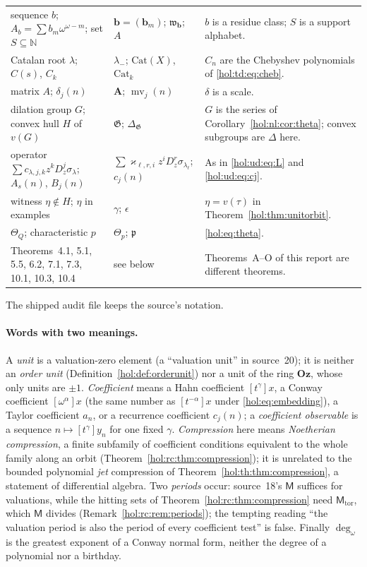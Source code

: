 \documentclass[11pt]{article}
\numberwithin{equation}{section}
\theoremstyle{definition}
\theoremstyle{remark}
\newcommand{\N}{\mathbb N}
\newcommand{\Oz}{\mathbf{Oz}}
\begin{document}
{\begin{longtable}{@{}>{\raggedright\arraybackslash}p{}
>{\raggedright\arraybackslash}p{}
>{\raggedright\arraybackslash}p{}@{}}
sequence $b$; $A_b=\sum b_m\omega^{\omega-m}$; set $S\subseteq\N$ &
$\mathbf b=(\mathbf b_m)$; $\mathfrak w_{\mathbf b}$; $A$ & $b$ is a residue
class; $S$ is a support alphabet.\\
Catalan root $\lambda$; $C(s)$, $C_k$ & $\lambda_-$; $\mathrm{Cat}(X)$,
$\mathrm{Cat}_k$ & $C_n$ are the Chebyshev polynomials of
\eqref{hol:td:eq:cheb}.\\
matrix $A$; $\delta_j(n)$ & $\mathbf A$; $\operatorname{mv}_j(n)$ & $\delta$
is a scale.\\
dilation group $G$; convex hull $H$ of $v(G)$ & $\mathfrak G$;
$\Delta_{\mathfrak G}$ & $G$ is the series of
Corollary~\ref{hol:nl:cor:theta}; convex subgroups are $\Delta$ here.\\
operator $\sum c_{\lambda,j,k}z^kD_z^j\sigma_\lambda$; $A_s(n)$, $B_j(n)$ &
$\sum\varkappa_{\ell,r,i}z^iD_z^r\sigma_{\lambda_\ell}$; $c_j(n)$ & As in
\eqref{hol:ud:eq:L} and \eqref{hol:ud:eq:cj}.\\
witness $\eta\notin H$; $\eta$ in examples & $\gamma$; $\epsilon$ &
$\eta=v(\tau)$ in Theorem~\ref{hol:thm:unitorbit}.\\
$\Theta_Q$; characteristic $p$ & $\Theta_p$; $\mathfrak p$ &
\eqref{hol:eq:theta}.\\
Theorems~4.1, 5.1, 5.5, 6.2, 7.1, 7.3, 10.1, 10.3, 10.4 & see below &
Theorems~A--O of this report are different theorems.\\
\bottomrule
\end{longtable}}
The shipped audit file  keeps the
source's notation.

\paragraph{Words with two meanings.}
A \emph{unit} is a valuation-zero element (a ``valuation unit'' in source~20);
it is neither an \emph{order unit} (Definition~\ref{hol:def:orderunit}) nor a
unit of the ring $\Oz$, whose only units are $\pm1$. \emph{Coefficient} means a
Hahn coefficient $[t^\gamma]x$, a Conway coefficient $[\omega^\alpha]x$ (the
same number as $[t^{-\alpha}]x$ under \eqref{hol:eq:embedding}), a Taylor
coefficient $a_n$, or a recurrence coefficient $c_j(n)$; a
\emph{coefficient observable} is a sequence $n\mapsto[t^\gamma]y_n$ for one
fixed $\gamma$. \emph{Compression} here means \emph{Noetherian compression}, a
finite subfamily of coefficient conditions equivalent to the whole family
along an orbit (Theorem~\ref{hol:rc:thm:compression}); it is unrelated to the
bounded polynomial \emph{jet} compression of
Theorem~\ref{hol:th:thm:compression}, a statement of differential algebra.
Two \emph{periods} occur: source~18's $\mathsf M$ suffices for valuations,
while the hitting sets of Theorem~\ref{hol:rc:thm:compression} need
$\mathsf M_{\mathrm{tor}}$, which $\mathsf M$ divides
(Remark~\ref{hol:rc:rem:periods}); the tempting reading ``the valuation period
is also the period of every coefficient test'' is false. Finally
$\deg_\omega$ is the greatest exponent of a Conway normal form, neither the
degree of a polynomial nor a birthday.
\end{document}
